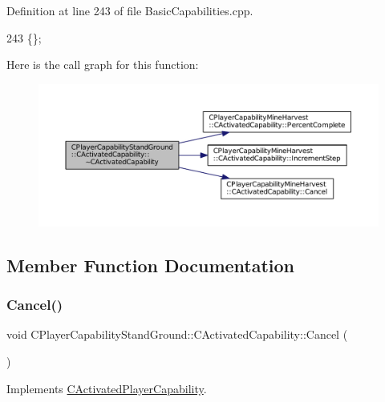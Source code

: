 Definition at line 243 of file Basic\+Capabilities.\+cpp.


\begin{DoxyCode}
243 \{\};
\end{DoxyCode}
Here is the call graph for this function\+:
\nopagebreak
\begin{figure}[H]
\begin{center}
\leavevmode
\includegraphics[width=350pt]{classCPlayerCapabilityStandGround_1_1CActivatedCapability_a7fe4c33b38b30befad569944ded1e402_cgraph}
\end{center}
\end{figure}


\subsection{Member Function Documentation}
\hypertarget{classCPlayerCapabilityStandGround_1_1CActivatedCapability_ac75cd8a26726adb60cf045f99059ca7d}{}\label{classCPlayerCapabilityStandGround_1_1CActivatedCapability_ac75cd8a26726adb60cf045f99059ca7d} 
\subsubsection{\texorpdfstring{Cancel()}{Cancel()}}
{\footnotesize\ttfamily void C\+Player\+Capability\+Stand\+Ground\+::\+C\+Activated\+Capability\+::\+Cancel (\begin{DoxyParamCaption}{ }\end{DoxyParamCaption})\hspace{0.3cm}{\ttfamily [virtual]}}



Implements \hyperlink{classCActivatedPlayerCapability_a5cde83be468e262ad054d81e28684a81}{C\+Activated\+Player\+Capability}.



